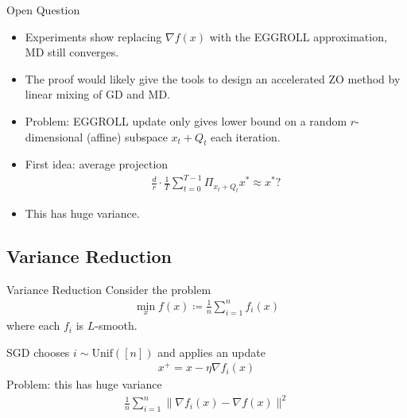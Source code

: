 \documentclass[10pt]{beamer}
\newcommand{\mg}[1]{\| #1 \|}
\renewcommand{\grad}{\nabla}
\newcommand{\1}{\mathbbm{1}}
\begin{document}
\begin{frame}{Open Question}
    \begin{itemize}
        \item Experiments show replacing $\grad f(x)$ with the EGGROLL approximation, MD still converges.
        \item The proof would likely give the tools to design an accelerated ZO method by linear mixing of GD and MD.
        \item Problem: EGGROLL update only gives lower bound on a random $r$-dimensional (affine) subspace $x_t + Q_t$ each iteration.
        \item First idea: average projection
        \begin{align*}
            \frac{d}{r} \cdot \frac{1}{T} \sum_{t=0}^{T-1} \Pi_{x_t + Q_t} x^* \approx x^* ?
        \end{align*}
        \item This has huge variance. 
    \end{itemize}
\end{frame}

\subsection{Variance Reduction}
\begin{frame}{Variance Reduction}
    Consider the problem
    \begin{align*}
        \min_x f(x) \coloneqq \frac 1n \sum_{i=1}^n f_i(x)
    \end{align*}
    where each $f_i$ is $L$-smooth.

    SGD chooses $i \sim \mathrm{Unif}([n])$ and applies an update
    \begin{align*}
        x^+ = x - \eta \grad f_i(x)
    \end{align*}
    Problem: this has huge variance
    \begin{align*}
        \frac{1}{n} \sum_{i=1}^n \mg{\grad f_i(x) - \grad f(x)}^2
    \end{align*}
\end{frame}
\end{document}
